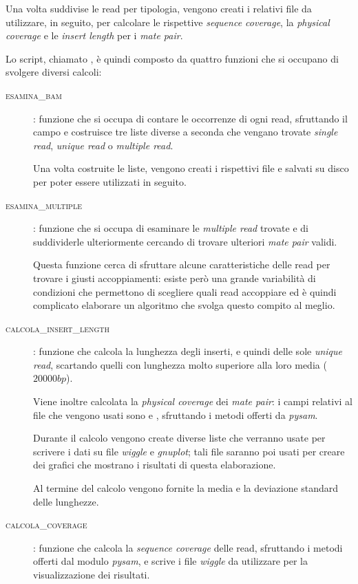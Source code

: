 Una volta suddivise le read per tipologia, vengono creati i relativi file  da utilizzare, in seguito, per calcolare le rispettive \emph{sequence coverage}, la \emph{physical coverage} e le \emph{insert length} per i \emph{mate pair}.

Lo script, chiamato , è quindi composto da quattro funzioni che si occupano di svolgere diversi calcoli:

\begin{description}
\item[\textsc{esamina\_bam}]: funzione che si occupa di contare le occorrenze di ogni read, sfruttando il campo  e costruisce tre liste diverse a seconda che vengano trovate \emph{single read}, \emph{unique read} o \emph{multiple read}.

Una volta costruite le liste, vengono creati i rispettivi file  e salvati su disco per poter essere utilizzati in seguito.

\item[\textsc{esamina\_multiple}]: funzione che si occupa di esaminare le \emph{multiple read} trovate e di suddividerle ulteriormente cercando di trovare ulteriori \emph{mate pair} validi.

Questa funzione cerca di sfruttare alcune caratteristiche delle read per trovare i giusti accoppiamenti: esiste però una grande variabilità di condizioni che permettono di scegliere quali read accoppiare ed è quindi complicato elaborare un algoritmo che svolga questo compito al meglio.

\item[\textsc{calcola\_insert\_length}]: funzione che calcola la lunghezza degli inserti, e quindi delle sole \emph{unique read}, scartando quelli con lunghezza molto superiore alla loro media ($20000bp$).

Viene inoltre calcolata la \emph{physical coverage} dei \emph{mate pair}: i campi relativi al file  che vengono usati sono  e , sfruttando i metodi offerti da \emph{pysam}.

Durante il calcolo vengono create diverse liste che verranno usate per scrivere i dati su file \emph{wiggle} e \emph{gnuplot}; tali file saranno poi usati per creare dei grafici che mostrano i risultati di questa elaborazione.

Al termine del calcolo vengono fornite la media e la deviazione standard delle lunghezze.

\item[\textsc{calcola\_coverage}]: funzione che calcola la \emph{sequence coverage} delle read, sfruttando i metodi offerti dal modulo \emph{pysam}, e scrive i file \emph{wiggle} da utilizzare per la visualizzazione dei risultati.
\end{description}

